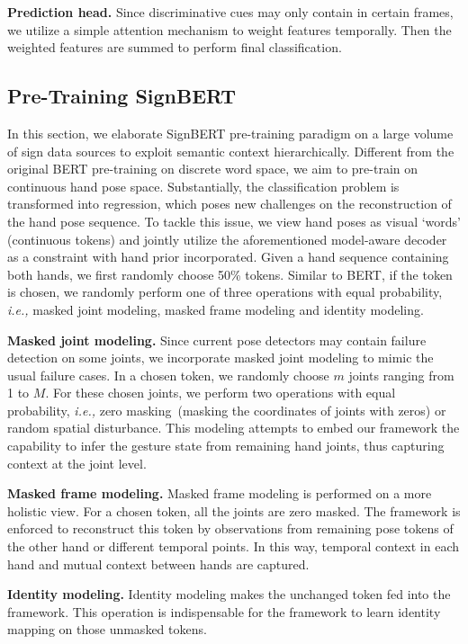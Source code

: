 \documentclass[10pt,twocolumn,letterpaper]{article}
\begin{document}
\noindent \textbf{Prediction head.}
Since discriminative cues may only contain in certain frames, we utilize a simple attention mechanism to weight features temporally.
Then the weighted features are summed to perform final classification.



\subsection{Pre-Training SignBERT}
In this section, we elaborate SignBERT pre-training paradigm on a large volume of sign data sources to exploit semantic context hierarchically.
Different from the original BERT pre-training on discrete word space, we aim to pre-train on continuous hand pose space.
Substantially, the classification problem is transformed into regression, which poses new challenges on the reconstruction of the hand pose sequence.
To tackle this issue, we view hand poses as visual `words' (continuous tokens) and jointly utilize the aforementioned model-aware decoder as a constraint with hand prior incorporated.
Given a hand sequence containing both hands, we first randomly choose 50\% tokens.
Similar to BERT, if the token is chosen, we randomly perform one of three operations with equal probability, \emph{i.e.,} masked joint modeling, masked frame modeling and identity modeling.

\noindent \textbf{Masked joint modeling.}
Since current pose detectors may contain failure detection on some joints, we incorporate masked joint modeling to mimic the usual failure cases.
In a chosen token, we randomly choose $m$ joints ranging from 1 to $M$.
For these chosen joints, we perform two operations with equal probability, \emph{i.e.,} zero masking~(masking the coordinates of joints with zeros) or random spatial disturbance.
This modeling attempts to embed our framework the capability to infer the gesture state from remaining hand joints, thus capturing context at the joint level.

\noindent \textbf{Masked frame modeling.}
Masked frame modeling is performed on a more holistic view.
For a chosen token, all the joints are zero masked.
The framework is enforced to reconstruct this token by observations from remaining pose tokens of the other hand or different temporal points.
In this way, temporal context in each hand and mutual context between hands are captured.

\noindent \textbf{Identity modeling.}
Identity modeling makes the unchanged token fed into the framework.
This operation is indispensable for the framework to learn identity mapping on those unmasked tokens.
\end{document}
